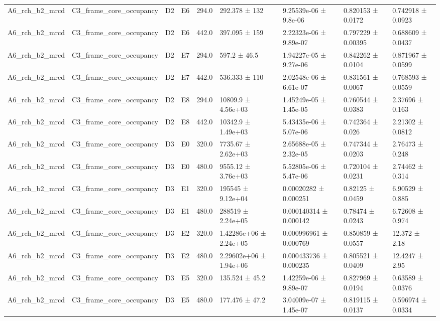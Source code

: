 \begin{table}
\begin{tabular}{lllllllll}
A6\_rch\_b2\_mrcd & C3\_frame\_core\_occupancy & D2 & E6 & 294.0 & 292.378 ± 132 & 9.25539e-06 ± 9.8e-06 & 0.820153 ± 0.0172 & 0.742918 ± 0.0923 \\
A6\_rch\_b2\_mrcd & C3\_frame\_core\_occupancy & D2 & E6 & 442.0 & 397.095 ± 159 & 2.22323e-06 ± 9.89e-07 & 0.797229 ± 0.00395 & 0.688609 ± 0.0437 \\
A6\_rch\_b2\_mrcd & C3\_frame\_core\_occupancy & D2 & E7 & 294.0 & 597.2 ± 46.5 & 1.94227e-05 ± 9.27e-06 & 0.842262 ± 0.0104 & 0.871967 ± 0.0599 \\
A6\_rch\_b2\_mrcd & C3\_frame\_core\_occupancy & D2 & E7 & 442.0 & 536.333 ± 110 & 2.02548e-06 ± 6.61e-07 & 0.831561 ± 0.0067 & 0.768593 ± 0.0559 \\
A6\_rch\_b2\_mrcd & C3\_frame\_core\_occupancy & D2 & E8 & 294.0 & 10809.9 ± 4.56e+03 & 1.45249e-05 ± 1.45e-05 & 0.760544 ± 0.0383 & 2.37696 ± 0.163 \\
A6\_rch\_b2\_mrcd & C3\_frame\_core\_occupancy & D2 & E8 & 442.0 & 10342.9 ± 1.49e+03 & 5.43435e-06 ± 5.07e-06 & 0.742364 ± 0.026 & 2.21302 ± 0.0812 \\
A6\_rch\_b2\_mrcd & C3\_frame\_core\_occupancy & D3 & E0 & 320.0 & 7735.67 ± 2.62e+03 & 2.65688e-05 ± 2.32e-05 & 0.747344 ± 0.0203 & 2.76473 ± 0.248 \\
A6\_rch\_b2\_mrcd & C3\_frame\_core\_occupancy & D3 & E0 & 480.0 & 9555.12 ± 3.76e+03 & 5.52805e-06 ± 5.47e-06 & 0.720104 ± 0.0231 & 2.74462 ± 0.314 \\
A6\_rch\_b2\_mrcd & C3\_frame\_core\_occupancy & D3 & E1 & 320.0 & 195545 ± 9.12e+04 & 0.00020282 ± 0.000251 & 0.82125 ± 0.0459 & 6.90529 ± 0.885 \\
A6\_rch\_b2\_mrcd & C3\_frame\_core\_occupancy & D3 & E1 & 480.0 & 288519 ± 2.24e+05 & 0.000140314 ± 0.000142 & 0.78474 ± 0.0243 & 6.72608 ± 0.974 \\
A6\_rch\_b2\_mrcd & C3\_frame\_core\_occupancy & D3 & E2 & 320.0 & 1.42286e+06 ± 2.24e+05 & 0.000996961 ± 0.000769 & 0.850859 ± 0.0557 & 12.372 ± 2.18 \\
A6\_rch\_b2\_mrcd & C3\_frame\_core\_occupancy & D3 & E2 & 480.0 & 2.29602e+06 ± 1.94e+06 & 0.000433736 ± 0.000235 & 0.805521 ± 0.0409 & 12.4247 ± 2.95 \\
A6\_rch\_b2\_mrcd & C3\_frame\_core\_occupancy & D3 & E5 & 320.0 & 135.524 ± 45.2 & 1.42259e-06 ± 9.89e-07 & 0.827969 ± 0.0194 & 0.63589 ± 0.0376 \\
A6\_rch\_b2\_mrcd & C3\_frame\_core\_occupancy & D3 & E5 & 480.0 & 177.476 ± 47.2 & 3.04009e-07 ± 1.45e-07 & 0.819115 ± 0.0137 & 0.596974 ± 0.0334 \\

\end{tabular}
\end{table}
